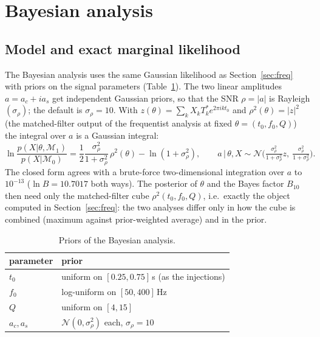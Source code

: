 \section{Bayesian analysis}\label{sec:bayes}

\subsection{Model and exact marginal likelihood}
The Bayesian analysis uses the same Gaussian likelihood as Section~\ref{sec:freq} with priors on the signal parameters (Table~\ref{tab:priors}). The two linear amplitudes $a=a_c+ia_s$ get independent Gaussian priors, so that the SNR $\rho=|a|$ is Rayleigh$(\sigma_\rho)$; the default is $\sigma_\rho=10$.
With $z(\theta)=\sum_kX_kT_k^*e^{2\pi ik t_0}$ and $\rho^2(\theta)=|z|^2$ (the matched-filter output of the frequentist analysis at fixed $\theta=(t_0,f_0,Q)$) the integral over $a$ is a Gaussian integral:
\begin{equation}
\ln\frac{p(X|\theta,\mathcal M_1)}{p(X|\mathcal M_0)}=\frac12\frac{\sigma_\rho^2}{1+\sigma_\rho^2}\,\rho^2(\theta)-\ln(1+\sigma_\rho^2),\qquad
a\,|\,\theta,X\sim\mathcal N\!\Big(\tfrac{\sigma_\rho^2}{1+\sigma_\rho^2}z,\ \tfrac{\sigma_\rho^2}{1+\sigma_\rho^2}\Big).
\end{equation}
The closed form agrees with a brute-force two-dimensional integration over $a$ to $10^{-13}$ ($\ln B=10.7017$ both ways). The posterior of $\theta$ and the Bayes factor $B_{10}$ then need only the matched-filter cube $\rho^2(t_0,f_0,Q)$, i.e.\ exactly the object computed in Section~\ref{sec:freq}:
the two analyses differ only in how the cube is combined (maximum against prior-weighted average) and in the prior.

\begin{table}[h]\centering\small
\begin{tabular}{ll}
\toprule
parameter & prior\\
\midrule
$t_0$ & uniform on $[0.25,0.75]$\,s (as the injections)\\
$f_0$ & log-uniform on $[50,400]$\,Hz\\
$Q$ & uniform on $[4,15]$\\
$a_c,a_s$ & $\mathcal N(0,\sigma_\rho^2)$ each, $\sigma_\rho=10$\\
\bottomrule
\end{tabular}
\caption{Priors of the Bayesian analysis.}\label{tab:priors}
\end{table}

